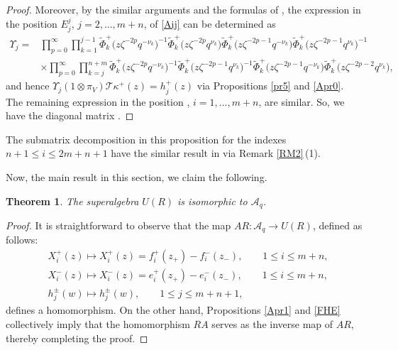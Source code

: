 \documentclass[10pt,a4paper]{amsart}
\numberwithin{equation}{section}
\newtheorem{Theorem}{Theorem}[section]
\begin{document}
\begin{proof}
Moreover, by the similar arguments and the formulas of ,
the expression in the position $E^j_j$, $j=2,\dots,m+n$, of \eqref{Aij} can be determined as
\begin{align*}
 \Upsilon_j={}&\prod\limits_{p=0}^{\infty}\prod\limits_{k=1}^{j-1}\widetilde{\Phi}^{+}_{k}\bigl(z\zeta^{-2p} q^{-\nu_k}\bigr)^{-1}\widetilde{\Phi}^{+}_{k}\bigl(z\zeta^{-2p} q^{\nu_k}\bigr)\widetilde{\Phi}^{+}_{k}\bigl(z\zeta^{-2p-1} q^{-\nu_k}\bigr)\widetilde{\Phi}^{+}_{k}\bigl(z\zeta^{-2p-1} q^{\nu_k}\bigr)^{-1}\\
&\times \prod\limits_{p=0}^{\infty}\prod\limits_{k=j}^{n+m}\widetilde{\Phi}^{+}_{k}\bigl(z\zeta^{-2p} q^{-\nu_k}\bigr)^{-1}\widetilde{\Phi}^{+}_{k}\bigl(z\zeta^{-2p-1} q^{\nu_k}\bigr)^{-1}\widetilde{\Phi}^{+}_{k}\bigl(z\zeta^{-2p-1} q^{-\nu_k}\bigr)\widetilde{\Phi}^{+}_{k}\bigl(z\zeta^{-2p-2} q^{\nu_k}\bigr),
\end{align*}
and hence
$\Upsilon_j(1\otimes\pi_V)\mathcal{T}\kappa^{+}(z)=h_j^{+}(z)
$
via Propositions \ref{pr5} and \ref{Apr0}.
The remaining expression in the position , $i=1,\dots,m+n$, are similar. So, we have the diagonal matrix .
\end{proof}

\begin{Remark}
The submatrix decomposition in this proposition for the indexes $n+1\leq i\leq 2m+n+1$ have the similar result in \cite{JMAB} via Remark \ref{RM2}\,(1).
\end{Remark}


Now, the main result in this section, we claim the following.


\begin{Theorem}\label{th4}
The superalgebra $U(R)$ is isomorphic to $\mathcal{A}_q$.
\end{Theorem}

\begin{proof}
It is straightforward to observe that the map $AR\colon \mathcal{A}_q\rightarrow U(R)$, defined as follows:
\begin{align*}
 &X_i^{+}(z)\mapsto X^{+}_i(z)=f^+_{i}(z_+)-f^-_{i}(z_-), \qquad 1\leq i\leq m+n,\\
 &X^{-}_i(z)\mapsto X^{-}_i(z)=e^+_{i}(z_+)-e^-_{i}(z_-),\qquad 1\leq i\leq m+n,\\
 &h_j^{\pm}(w)\mapsto h_j^{\pm}(w), \qquad 1\leq j\leq m+n+1,
\end{align*}
defines a homomorphism. On the other hand, Propositions \ref{Apr1} and \ref{FHE} collectively imply that the homomorphism $RA$ serves as the inverse map of $AR$, thereby completing the proof.
\end{proof}
\end{document}
